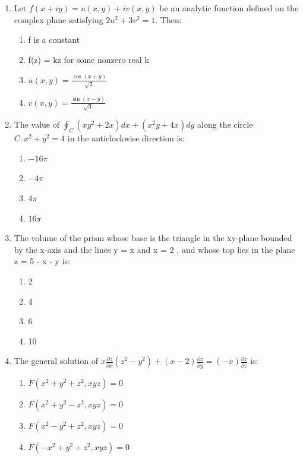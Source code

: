 \documentclass[journal,cmex10]{IEEEtran}
\theoremstyle{remark}
\numberwithin{equation}{enumi}
\numberwithin{figure}{enumi}
\begin{document}
\begin{enumerate}[label=\arabic*)]
    \item Let  $f(x+iy) = u(x,y) + iv(x,y)$ be an analytic function defined on the complex plane satisfying $2u^2 + 3v^2 = 1$. Then:
    \bigskip
    \hfill {}
    \begin{enumerate}[label=\alph*)]
        \item  f  is a constant
        \item f(z) = kz for some nonzero real k 
        \item $u(x,y) = \frac{\cos(x+y)}{\sqrt{2}}$
        \item $v(x,y) = \frac{\sin(x-y)}{\sqrt{3}}$
    \end{enumerate}
    \bigskip

    \item The value of $\oint_C \left( xy^2 + 2x \right) dx + \left( x^2 y + 4x \right) dy$ along the circle $C: x^2 + y^2 = 4$ in the anticlockwise direction is:
    \bigskip
    \hfill {}
    \begin{enumerate}[label=\alph*)]
        \item $-16\pi$
        \item $-4\pi$
        \item $4\pi$
        \item $16\pi$
    \end{enumerate}
    \bigskip

    \item The volume of the prism whose base is the triangle in the xy-plane bounded by the x-axis and the lines y = x and x = 2 , and whose top lies in the plane z = 5 - x - y is:
    \bigskip
    \hfill {}
    \begin{enumerate}[label=\alph*)]
        \item 2
        \item 4
        \item 6
        \item 10
    \end{enumerate}
    \newpage

    \item The general solution of $x \frac{\partial z}{\partial x} (z^2 - y^2) + (x - 2) \frac{\partial z}{\partial y} = (-x) \frac{\partial z}{\partial z}$ is:
    \bigskip
    \hfill {}
    \begin{enumerate}[label=\alph*)]
        \item $F(x^2 + y^2 + z^2, xyz) = 0$
        \item $F(x^2 + y^2 - z^2, xyz) = 0$
        \item $F(x^2 - y^2 + z^2, xyz) = 0$
        \item $F(-x^2 + y^2 + z^2, xyz) = 0$
    \end{enumerate}
    \bigskip


\end{enumerate}
\end{document}
